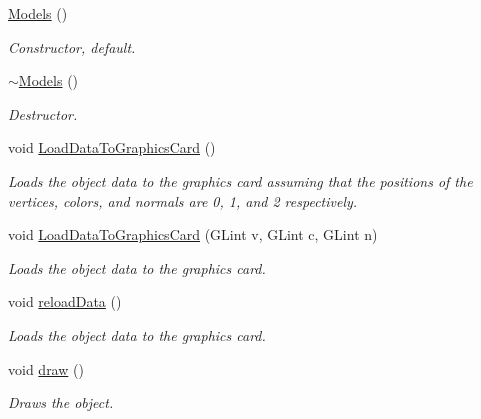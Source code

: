 \begin{DoxyCompactItemize}
\item 
\mbox{\label{class_models_a3d822d79de8a3a3e4a89b48231110cec}} 
\hyperlink{class_models_a3d822d79de8a3a3e4a89b48231110cec}{Models} ()
\begin{DoxyCompactList}\small\item\em Constructor, default. \end{DoxyCompactList}\item 
\hyperlink{class_models_aef02b88508c7cf66170381982e57ce3e}{$\sim$\+Models} ()
\begin{DoxyCompactList}\small\item\em Destructor. \end{DoxyCompactList}\item 
\mbox{\label{class_models_a37639ded69e396965605f32b7a977166}} 
void \hyperlink{class_models_a37639ded69e396965605f32b7a977166}{Load\+Data\+To\+Graphics\+Card} ()
\begin{DoxyCompactList}\small\item\em Loads the object data to the graphics card assuming that the positions of the vertices, colors, and normals are 0, 1, and 2 respectively. \end{DoxyCompactList}\item 
void \hyperlink{class_models_a714b178453d5794649be0f0ca76fc938}{Load\+Data\+To\+Graphics\+Card} (G\+Lint v, G\+Lint c, G\+Lint n)
\begin{DoxyCompactList}\small\item\em Loads the object data to the graphics card. \end{DoxyCompactList}\item 
\mbox{\label{class_models_a9919b08422ec91e79a3084ce7e565429}} 
void \hyperlink{class_models_a9919b08422ec91e79a3084ce7e565429}{reload\+Data} ()
\begin{DoxyCompactList}\small\item\em Loads the object data to the graphics card. \end{DoxyCompactList}\item 
\mbox{\label{class_models_a302e2de33467a2cdb283c9b34ced49b6}} 
void \hyperlink{class_models_a302e2de33467a2cdb283c9b34ced49b6}{draw} ()
\begin{DoxyCompactList}\small\item\em Draws the object. \end{DoxyCompactList}\item 

\end{DoxyCompactItemize}
